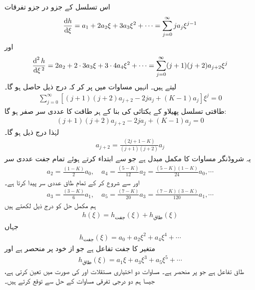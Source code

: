  اس تسلسل کے جزو در جزو تفرقات
\begin{align*}
\frac{\dif{h}}{\dif{\xi}}=a_{1}+2a_{2}\xi+3a_{3}\xi^{2}+\cdots =\sum_{j=0}^{\infty}ja_{j}\xi^{j-1}
\end{align*}
اور
\begin{align*}
\frac{\dif^{\,2}{h}}{\dif{\xi^{\,2}}}=2a_{2}+2\cdot 3a_{3}\xi+3\cdot 4a_{4}\xi^{2}+\cdots =\sum_{j=0}^{\infty}(j+1)(j+2)a_{j+2}\xi^{j}
\end{align*}
لیتے ہیں۔ انہیں مساوات  میں پر کر کہ درج ذیل حاصل ہو گا۔
\begin{align}
\sum_{j=0}^{\infty}[(j+1)(j+2)a_{j+2}-2ja_{j}+(K-1)a_{j}]\xi^{j}=0
\end{align}
طاقتی تسلسل پھیلاو کے یکتائی  کی بنا   کے ہر طاقت کا عددی سر  صفر ہو گا:
\begin{align*}
(j+1)(j+2)a_{j+2}-2ja_{j}+(K-1)a_{j}=0
\end{align*}
لہٰذا درج ذیل ہو گا۔
\begin{align}\label{مساوات_شروڈنگر_کلیہ_توالی_الف}
a_{j+2}=\frac{(2j+1-K)}{(j+1)(j+2)}a_{j}
\end{align}
یہ   شروڈنگر مساوات کا مکمل مبدل ہے جو  سے ابتداء کرتے ہوئے تمام جفت عددی سر
\begin{align*}
a_{2}=\frac{(1-K)}{2}a_{0}, \quad a_{4}=\frac{(5-K)}{12}a_{2}=\frac{(5-K)(1-K)}{24}a_{0},\cdots
\end{align*}
اور  سے شروع کر کے تمام طاق عددی سر پیدا کرتا ہے۔
\begin{align*}
a_{3}=\frac{(3-K)}{6}a_{1},\quad a_{5}=\frac{(7-K)}{20}a_{3}=\frac{(7-K)(3-K)}{120}a_{1},\cdots
\end{align*}
ہم مکمل حل کو درج ذیل لکھتے ہیں
\begin{align}\label{مساوات_شروڈنگر_کلیہ_توالی_ب}
h(\xi)=h_{\text{جفت}}(\xi)+h_{\text{طاق}}(\xi)
\end{align}
جہاں 
\begin{align*}
h_{\text{جفت}}(\xi)=a_{0}+a_{2}\xi^{2}+a_{4}\xi^{4}+\cdots
\end{align*}
متغیر  کا جفت تفاعل ہے جو از خود  پر منحصر ہے اور 
\begin{align*}
h_{\text{طاق}}(\xi)=a_{1}\xi+a_{3}\xi^{3}+a_{5}\xi^{5}+\cdots
\end{align*}
طاق تفاعل ہے جو  پر منحصر ہے۔  مساوات  دو اختیاری مستقلات 
اور  کی صورت میں  تعین کرتی ہے، جیسا ہم دو درجی تفرقی مساوات کے حل سے توقع کرتے ہیں۔

